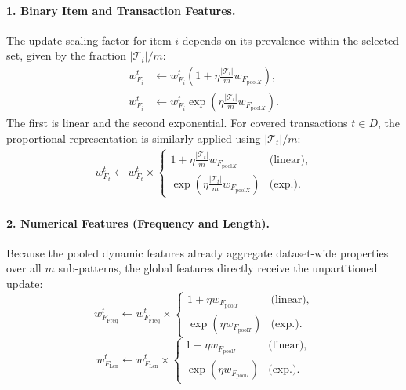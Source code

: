 \documentclass[sigconf]{acmart}
\newcommand{\pool}{\mathrm{pool}}
\newcommand{\Freq}{\mathrm{Freq}}
\newcommand{\Len}{\mathrm{Len}}
\begin{document}
\paragraph{1. Binary Item and Transaction Features.}
The update scaling factor for item $i$ depends on its prevalence within the selected set, given by the fraction $|\mathcal T_i|/m$:
\begin{align}
 w_{F_i}^{t}&\leftarrow w_{F_i}^{t}\left(1+\eta\frac{|\mathcal T_i|}{m}w_{F_{\pool X}}\right), \label{eq:pool-lin-item}\\
 w_{F_i}^{t}&\leftarrow w_{F_i}^{t}\exp\!\left(\eta\frac{|\mathcal T_i|}{m}w_{F_{\pool X}}\right). \label{eq:pool-exp-item}
\end{align}
The first is linear and the second exponential. For covered transactions $t\in D$, the proportional representation is similarly applied using $|\mathcal T_t|/m$:
\begin{equation}\label{eq:pool-transaction}
\begin{split}
 w_{F_t}^{t}\leftarrow w_{F_t}^{t}\times\begin{cases}
 1+\eta\frac{|\mathcal T_t|}{m}w_{F_{\pool X}}&\text{(linear)},\\
 \exp\!\left(\eta\frac{|\mathcal T_t|}{m}w_{F_{\pool X}}\right)&\text{(exp.)}.
 \end{cases}
\end{split}
\end{equation}

\paragraph{2. Numerical Features (Frequency and Length).}
Because the pooled dynamic features already aggregate dataset-wide properties over all $m$ sub-patterns, the global features directly receive the unpartitioned update:
\begin{equation}\label{eq:pool-freq}
 w_{F_{\Freq}}^t\leftarrow w_{F_{\Freq}}^t\times\begin{cases}
 1+\eta w_{F_{\pool T}} &\text{(linear)},\\
 \exp\!(\eta w_{F_{\pool T}}) &\text{(exp.)}.
 \end{cases}
\end{equation}
\begin{equation}\label{eq:pool-len}
 w_{F_{\Len}}^t\leftarrow w_{F_{\Len}}^t\times\begin{cases}
 1+\eta w_{F_{\pool I}} &\text{(linear)},\\
 \exp\!(\eta w_{F_{\pool I}}) &\text{(exp.)}.
 \end{cases}
\end{equation}
\end{document}
